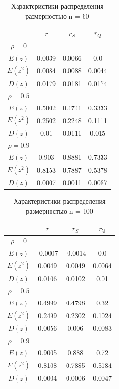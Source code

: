 \documentclass[../main.tex]{subfiles}
\begin{document}
    \begin{table}[H]
        \centering
        \begin{tabular}{|c|c|c|c|}
            \hline
            & $r$ & $r_S$ & $r_Q$\\\hline
            $\rho=0$ & & &\\\hline
            $E(z)$ & 0.0039 & 0.0066 & 0.0\\\hline
            $E(z^2)$ & 0.0084 & 0.0088 & 0.0044\\\hline
            $D(z)$ & 0.0179 & 0.0181 & 0.0174\\\hline
            \hline
            $\rho=0.5$ & & &\\\hline
            $E(z)$ & 0.5002 & 0.4741 & 0.3333\\\hline
            $E(z^2)$ & 0.2502 & 0.2248 & 0.1111\\\hline
            $D(z)$ & 0.01 & 0.0111 & 0.015\\\hline
            \hline
            $\rho=0.9$ & & &\\\hline
            $E(z)$ & 0.903 & 0.8881 & 0.7333\\\hline
            $E(z^2)$ & 0.8153 & 0.7887 & 0.5378\\\hline
            $D(z)$ & 0.0007 & 0.0011 & 0.0087\\\hline
        \end{tabular}
        \caption{Характеристики распределения размерностью n = 60}
    \end{table}
    
    \begin{table}[H]
        \centering
        \begin{tabular}{|c|c|c|c|}
            \hline
            & $r$ & $r_S$ & $r_Q$\\\hline
            $\rho=0$ & & &\\\hline
            $E(z)$ & -0.0007 & -0.0014 & 0.0\\\hline
            $E(z^2)$ & 0.0049 & 0.0049 & 0.0064\\\hline
            $D(z)$ & 0.0106 & 0.0102 & 0.01\\\hline
            \hline
            $\rho=0.5$ & & &\\\hline
            $E(z)$ & 0.4999 & 0.4798 & 0.32\\\hline
            $E(z^2)$ & 0.2499 & 0.2302 & 0.1024\\\hline
            $D(z)$ & 0.0056 & 0.006 & 0.0083\\\hline
            \hline
            $\rho=0.9$ & & &\\\hline
            $E(z)$ & 0.9005 & 0.888 & 0.72\\\hline
            $E(z^2)$ & 0.8108 & 0.7885 & 0.5184\\\hline
            $D(z)$ & 0.0004 & 0.0006 & 0.0047\\\hline
        \end{tabular}
        \caption{Характеристики распределения размерностью n = 100}
    \end{table}
    
\end{document}
